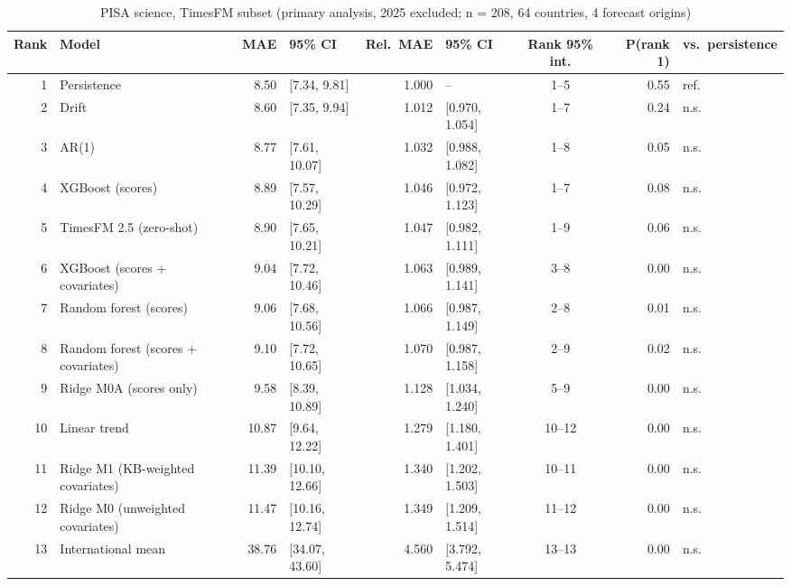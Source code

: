 \begin{table}[htbp]
\centering
\footnotesize
\caption{PISA science, TimesFM subset (primary analysis, 2025 excluded; n = 208, 64 countries, 4 forecast origins)}
\label{tab:A12}
\begin{tabular}{rlrlrlcrl}
\toprule
Rank & Model & MAE & 95\% CI & Rel.\ MAE & 95\% CI & Rank 95\% int. & P(rank 1) & vs.\ persistence \\
\midrule
1 & Persistence & 8.50 & [7.34, 9.81] & 1.000 & -- & 1--5 & 0.55 & ref. \\
2 & Drift & 8.60 & [7.35, 9.94] & 1.012 & [0.970, 1.054] & 1--7 & 0.24 & n.s. \\
3 & AR(1) & 8.77 & [7.61, 10.07] & 1.032 & [0.988, 1.082] & 1--8 & 0.05 & n.s. \\
4 & XGBoost (scores) & 8.89 & [7.57, 10.29] & 1.046 & [0.972, 1.123] & 1--7 & 0.08 & n.s. \\
5 & TimesFM 2.5 (zero-shot) & 8.90 & [7.65, 10.21] & 1.047 & [0.982, 1.111] & 1--9 & 0.06 & n.s. \\
6 & XGBoost (scores + covariates) & 9.04 & [7.72, 10.46] & 1.063 & [0.989, 1.141] & 3--8 & 0.00 & n.s. \\
7 & Random forest (scores) & 9.06 & [7.68, 10.56] & 1.066 & [0.987, 1.149] & 2--8 & 0.01 & n.s. \\
8 & Random forest (scores + covariates) & 9.10 & [7.72, 10.65] & 1.070 & [0.987, 1.158] & 2--9 & 0.02 & n.s. \\
9 & Ridge M0A (scores only) & 9.58 & [8.39, 10.89] & 1.128 & [1.034, 1.240] & 5--9 & 0.00 & n.s. \\
10 & Linear trend & 10.87 & [9.64, 12.22] & 1.279 & [1.180, 1.401] & 10--12 & 0.00 & n.s. \\
11 & Ridge M1 (KB-weighted covariates) & 11.39 & [10.10, 12.66] & 1.340 & [1.202, 1.503] & 10--11 & 0.00 & n.s. \\
12 & Ridge M0 (unweighted covariates) & 11.47 & [10.16, 12.74] & 1.349 & [1.209, 1.514] & 11--12 & 0.00 & n.s. \\
13 & International mean & 38.76 & [34.07, 43.60] & 4.560 & [3.792, 5.474] & 13--13 & 0.00 & n.s. \\
\bottomrule
\end{tabular}
\par{}
\end{table}
